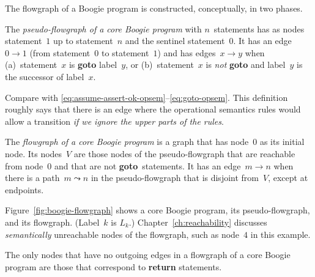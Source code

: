 \documentclass{llncs}
\begin{document}
The flowgraph of a Boogie program is constructed, conceptually,
in two phases.

\begin{definition}
The \emph{pseudo-flowgraph of a core Boogie program} with
$n$~statements has as nodes statement~$1$ up to statement~$n$
and the sentinel statement~$0$. It has an edge~$0\to1$
(from statement~$0$ to statement~$1$) and has edges~$x\to
y$ when (a)~statement~$x$ is \textbf{goto} label~$y$, or
(b)~statement~$x$ is \emph{not} \textbf{goto} and label~$y$ is
the successor of label~$x$.
\end{definition}

\begin{remark}
Compare with
\eqref{eq:assume-assert-ok-opsem}--\eqref{eq:goto-opsem}.
This definition roughly says that there is an edge where the
operational semantics rules would allow a transition \emph{if we
ignore the upper parts of the rules}.
\end{remark}

\begin{definition}
The \emph{flowgraph of a core Boogie program} is a graph that has
node~$0$ as its initial node. Its nodes~$V$ are those nodes of
the pseudo-flowgraph that are reachable from node~$0$ and that
are not \textbf{goto}~statements. It has an edge~$m\to n$ when
there is a path~$m\leadsto n$ in the pseudo-flowgraph that is
disjoint from~$V$, except at endpoints.
\label{def:boogie-flowgraph}
\end{definition}

\begin{example}
Figure~\ref{fig:boogie-flowgraph} shows a core Boogie program,
its pseudo-flowgraph, and its flowgraph. (Label~$k$ is $L_k$.)
Chapter~\ref{ch:reachability} discusses \emph{semantically}
unreachable nodes of the flowgraph, such as node~$4$ in this
example.
\end{example}

\begin{proposition}
The only nodes that have no outgoing edges in a flowgraph of a
core Boogie program are those that correspond to \textbf{return}
statements.
\end{proposition}
\end{document}
